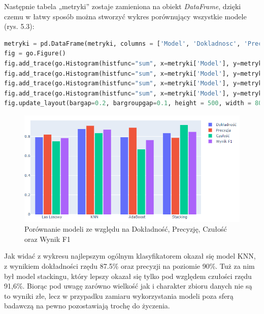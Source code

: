 \documentclass[a4paper,12pt,oneside]{book}
\begin{document}
Następnie tabela „metryki” zostaje zamieniona na obiekt \textit{DataFrame}, dzięki czemu w łatwy sposób można stworzyć wykres porównujący wszystkie modele (rys. 5.3):

\begin{lstlisting}[language=Python, caption=Tworzenie wykresu słupkowego porównującego modele]
metryki = pd.DataFrame(metryki, columns = ['Model', 'Dokladnosc', 'Precyzja', 'Czulosc', 'Wynik F1'])
fig = go.Figure()
fig.add_trace(go.Histogram(histfunc="sum", x=metryki['Model'], y=metryki['Dokladnosc'], name='Dokladnosc'))
fig.add_trace(go.Histogram(histfunc="sum", x=metryki['Model'], y=metryki['Precyzja'], name='Precyzja'))
fig.add_trace(go.Histogram(histfunc="sum", x=metryki['Model'], y=metryki['Czulosc'], name='Czulosc'))
fig.add_trace(go.Histogram(histfunc="sum", x=metryki['Model'], y=metryki['Wynik F1'], name='Wynik F1'))
fig.update_layout(bargap=0.2, bargroupgap=0.1, height = 500, width = 800)
\end{lstlisting}

\begin{figure}[H]
\centering
\includegraphics[scale=0.5]{metrykiHistShow.png}
\caption{Porównanie modeli ze względu na Dokładność, Precyzję, Czułość oraz Wynik F1}
\end{figure}

Jak widać z wykresu najlepszym ogólnym klasyfikatorem okazał się model KNN, z wynikiem dokładności rzędu 87.5\% oraz precyzji na poziomie 90\%. Tuż za nim był model stackingu, który lepszy okazał się tylko pod względem czułości rzędu 91,6\%. Biorąc pod uwagę zarówno wielkość jak i charakter zbioru danych nie są to wyniki złe, lecz w przypadku zamiaru wykorzystania modeli poza sferą badawczą na pewno pozostawiają trochę do życzenia.
\end{document}
